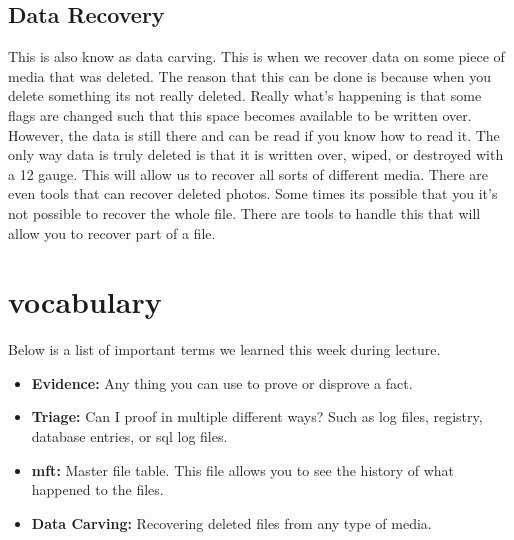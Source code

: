 \documentclass[letterpaper, onecolumn,10pt]{IEEEtran}
\begin{document}
            \subsection{Data Recovery} This is also know as data carving. This is when we recover data on some piece of media that was deleted. The reason that this can be done is because when you delete something its not really deleted. Really what's happening is that some flags are changed such that this space becomes available to be written over. However, the data is still there and can be read if you know how to read it. The only way data is truly deleted is that it is written over, wiped, or destroyed with a 12 gauge. This will allow us to recover all sorts of different media. There are even tools that can recover deleted photos. Some times its possible that you it's not possible to recover the whole file. There are tools to handle this that will allow you to recover part of a file.\\

		\section{vocabulary}
		    Below is a list of important terms we learned this week during lecture.\\
		    \begin{itemize}
		        \item \textbf{Evidence: } Any thing you can use to prove or disprove a fact.\\
		        \item \textbf{Triage: } Can I proof in multiple different ways? Such as log files, registry, database entries, or sql log files.\\
		        \item \textbf{mft: } Master file table. This file allows you to see the history of what happened to the files.\\
		        \item \textbf{Data Carving: } Recovering deleted files from any type of media.\\
		    \end{itemize}
		
\end{document}
